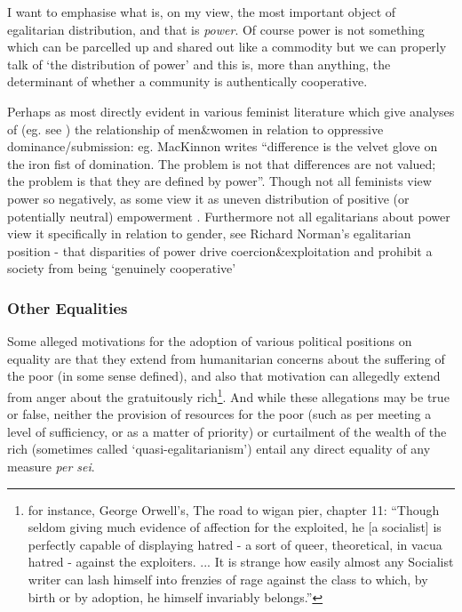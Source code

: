 \begin{displayquote}
I want to emphasise what is, on my view, the most important object of egalitarian distribution, and that is \textit{power}. Of course power is not something which can be parcelled up and shared out like a commodity but we can properly talk of `the distribution of power' and this is, more than anything, the determinant of whether a community is authentically cooperative.\cite{TheSocialBasisofEquality:1998}
\end{displayquote}


Perhaps as most directly evident in various feminist literature which give analyses of (eg. see \cite{Cudd2006-CUDAO}) the relationship of men\&women in relation to oppressive dominance/submission: eg. MacKinnon writes ``difference is the velvet glove on the iron fist of domination. The problem is not that differences are not valued; the problem is that they are defined by power''\cite{mackinnon1989toward}. Though not all feminists view power so negatively, as some view it as uneven distribution of positive (or potentially neutral) empowerment \cite{doi:10.1111/j.1527-2001.1998.tb01350.x}. Furthermore not all egalitarians about power view it specifically in relation to gender, see Richard Norman's egalitarian position - that disparities of power drive coercion\&exploitation and prohibit a society from being `genuinely cooperative'


\subsubsection{Other Equalities}

Some alleged motivations for the adoption of various political positions on equality are that they extend from humanitarian concerns about the suffering of the poor (in some sense defined), and also that motivation can allegedly extend from anger about the gratuitously rich\footnote{for instance, George Orwell's, The road to wigan pier, chapter 11: ``Though seldom giving much evidence of affection for the exploited, he [a socialist] is perfectly capable of displaying hatred - a sort of queer, theoretical, in vacua hatred - against the exploiters. ... It is strange how easily almost any Socialist writer can lash himself into frenzies of rage against the class to which, by birth or by adoption, he himself invariably belongs.'' }.
And while these allegations may be true or false, neither the provision of resources for the poor (such as per meeting a level of sufficiency, or as a matter of priority) or curtailment of the wealth of the rich (sometimes called `quasi-egalitarianism') entail any direct equality of any measure \textit{per sei}.



